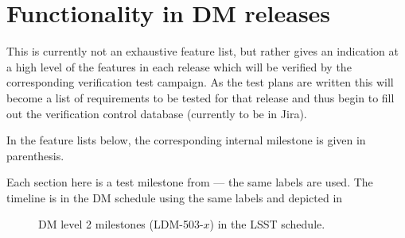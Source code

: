 \section{Functionality in DM releases}
\label{sect:features}

This is currently not an exhaustive feature list, but rather gives an indication at a high level of the features in each release which will be verified by the corresponding verification test campaign.
As the test plans are written this will become a list of requirements to be tested for that release and thus begin to fill out the verification control database (currently to be in Jira).

In the feature lists below, the corresponding internal milestone is given in parenthesis.

Each section here is a test milestone from  --- the same labels are used.
The timeline is in the DM schedule using the same labels and depicted in 

\begin{figure}[htbp]
        \begin{center}
                 
                 \caption{DM level 2 milestones (LDM-503-$x$) in the LSST schedule.}
                 \label{fig:schedule}
         \end{center}
 \end{figure}


